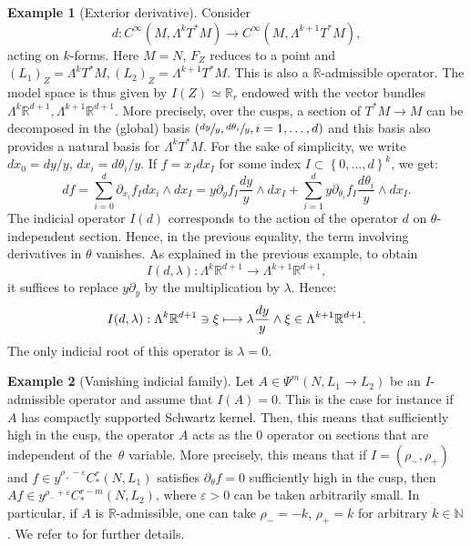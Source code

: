 \documentclass[JEP,XML,SOM,Unicode,NoFloatCountersInSection]{cedram}
\newcommand\mto{\mathchoice{\longmapsto}{\mapsto}{\mapsto}{\mapsto}}
\newcommand{\R}{\mathbb{R}}
\newcommand{\N}{\mathbb{N}}
\newcommand{\eps}{\varepsilon}
\theoremstyle{plain}
\theoremstyle{definition}
\newtheorem{example}{Example}[section]
\begin{document}
\begin{example}[Exterior derivative]
Consider
\[
d : C^\infty(M,\Lambda^k T^*M) \to C^\infty(M,\Lambda^{k+1} T^*M),
\]
acting on $k$-forms. Here $M = N$, $F_Z$ reduces to a point and $(L_1)_Z = \Lambda^k T^*M, (L_2)_Z = \Lambda^{k+1} T^*M$. This is also a $\R$-admissible operator. The model space is thus given by $I(Z) \simeq \R_r$ endowed with the vector bundles $\Lambda^k \R^{d+1},\Lambda^{k+1} \R^{d+1}$. More precisely, over the cusps, a section of $T^*M \to M$ can be decomposed in the (global) basis $\left(\sfrac{dy}{y}, \sfrac{d\theta_i}{y}, i=1,\dots,d\right)$ and this basis also provides a natural basis for $\Lambda^k T^*M$. For the sake of simplicity, we write $dx_0 = dy/y$, $dx_i = d\theta_i/y$. If $f = x_I dx_I$ for some index $I \subset \left\{0,\dots,d\right\}^k$, we get:
\[
df = \sum_{i=0}^d \partial_{x_i} f_I dx_i \wedge dx_I = y \partial_y f_I \frac{dy}{y} \wedge dx_I + \sum_{i=1}^d y \partial_{\theta_i} f_I \frac{d \theta_i}{y} \wedge dx_I.
\]
The indicial operator $I(d)$ corresponds to the action of the operator $d$ on $\theta$\nobreakdash-inde\-pen\-dent section. Hence, in the previous equality, the term involving derivatives in $\theta$ vanishes. As explained in the previous example, to obtain
\[
I(d,\lambda) :\Lambda^k \R^{d+1} \to \Lambda^{k+1} \R^{d+1},
\]
it suffices to replace $y \partial_y$ by the multiplication by $\lambda$. Hence:
\[
I(d,\lambda) : \Lambda^k \R^{d+1} \ni \xi \mto \lambda \frac{dy}{y} \wedge \xi \in \Lambda^{k+1} \R^{d+1}.
\]
The only indicial root of this operator is $\lambda = 0$.
\end{example}

\begin{example}[Vanishing indicial family]
\label{example:vanishing}
Let $A \in \Psi^m(N,L_1 \to L_2)$ be an $I$\nobreakdash-ad\-mis\-sible operator and assume that $I(A) = 0$. This is the case for instance if $A$ has compactly supported Schwartz kernel. Then, this means that sufficiently high in the cusp, the operator $A$ acts as the $0$ operator on sections that are independent of the~$\theta$ variable. More precisely, this means that if $I=(\rho_-,\rho_+)$ and $f \in y^{\rho_+-\eps} C^r_*(N,L_1)$ satisfies $\partial_\theta f = 0$ sufficiently high in the cusp, then $A f \in y^{\rho_- + \eps} C^{r-m}_*(N,L_2)$, where $\eps > 0$ can be taken arbitrarily small. In particular, if $A$ is $\R$-admissible, one can take $\rho_-=-k$, $\rho_+ = k$ for arbitrary $k \in \N$. We refer to \cite[Lem.\,4.10]{Bonthonneau-Lefeuvre-19-1} for further details.
\end{example}
\end{document}
